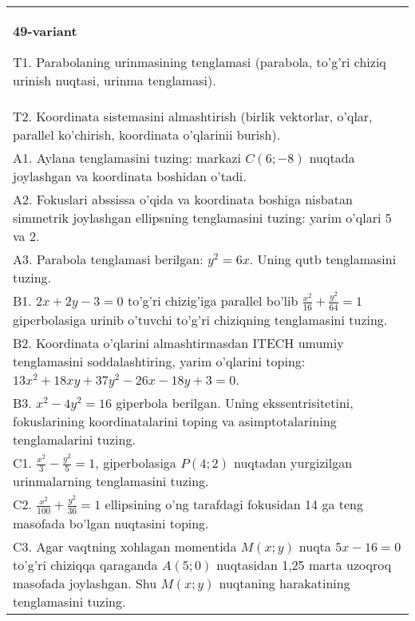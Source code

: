 \documentclass{article}
\begin{document}
\begin{tabular}{m{17cm}}
\textbf{49-variant}
\newline

T1. Parabolaning urinmasining tenglamasi (parabola, to'g'ri chiziq urinish nuqtasi, urinma tenglamasi).\\

T2. Koordinata sistemasini almashtirish (birlik vektorlar, o'qlar, parallel ko'chirish, koordinata o'qlarinii burish).\\

A1. Aylana tenglamasini tuzing: markazi $C(6;-8)$ nuqtada joylashgan va koordinata boshidan o'tadi.\\

A2. Fokuslari abssissa o'qida va koordinata boshiga nisbatan simmetrik joylashgan ellipsning tenglamasini tuzing: yarim o'qlari 5 va 2.\\

A3. Parabola tenglamasi berilgan: $y^2=6x$. Uning qutb tenglamasini tuzing.\\

B1. $2x + 2y - 3 = 0$ to'g'ri chizig'iga parallel bo'lib $\frac{x^{2}}{16} + \frac{y^{2}}{64} = 1$ giperbolasiga urinib o'tuvchi to'g'ri chiziqning tenglamasini tuzing.  \\

B2. Koordinata o'qlarini almashtirmasdan ITECH umumiy tenglamasini soddalashtiring, yarim o'qlarini toping: $13x^{2} + 18xy + 37y^{2} - 26x - 18y + 3 = 0$.  \\

B3. $x^{2} - 4y^{2} = 16$ giperbola berilgan. Uning ekssentrisitetini, fokuslarining koordinatalarini toping va asimptotalarining tenglamalarini tuzing.\\

C1. $\frac{x^{2}}{3} - \frac{y^{2}}{5} = 1$, giperbolasiga $P(4;2)$ nuqtadan yurgizilgan urinmalarning tenglamasini tuzing.  \\

C2. $\frac{x^{2}}{100} + \frac{y^{2}}{36} = 1$ ellipsining o'ng tarafdagi fokusidan 14 ga teng masofada bo'lgan nuqtasini toping.  \\

C3. Agar vaqtning xohlagan momentida $M(x;y)$ nuqta $5x - 16 = 0$ to'g'ri chiziqqa qaraganda $A(5;0)$ nuqtasidan 1,25 marta uzoqroq masofada joylashgan. Shu $M(x;y)$ nuqtaning harakatining tenglamasini tuzing.  \\

\end{tabular}
\vspace{1cm}
\end{document}
